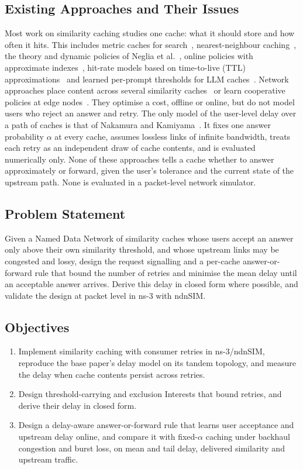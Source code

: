 \documentclass[11pt,a4paper]{article}
\begin{document}
\subsection{Existing Approaches and Their Issues}
Most work on similarity caching studies one cache: what it should store and how often it hits.
This includes metric caches for search~\cite{falchi2008metric}, nearest-neighbour
caching~\cite{pandey2009nn}, the theory and dynamic policies of Neglia et
al.~\cite{neglia2022similarity}, online policies with approximate indexes~\cite{sisalem2023acai},
hit-rate models based on time-to-live (TTL) approximations~\cite{benmazziane2024ttl} and learned
per-prompt thresholds for LLM caches~\cite{schroeder2025vcache}. Network approaches place content
across several similarity caches~\cite{garetto2021placement} or learn cooperative policies at edge
nodes~\cite{wang2025bandit}. They optimise a cost, offline or online, but do not model users who
reject an answer and retry. The only model of the user-level delay over a path of caches is that of
Nakamura and Kamiyama~\cite{nakamura2024analysis}. It fixes one answer probability $\alpha$ at every
cache, assumes lossless links of infinite bandwidth, treats each retry as an independent draw of
cache contents, and is evaluated numerically only. None of these approaches tells a cache whether to
answer approximately or forward, given the user's tolerance and the current state of the upstream
path. None is evaluated in a packet-level network simulator.

\subsection{Problem Statement}
Given a Named Data Network of similarity caches whose users accept an answer only above their own
similarity threshold, and whose upstream links may be congested and lossy, design the request
signalling and a per-cache answer-or-forward rule that bound the number of retries and minimise the
mean delay until an acceptable answer arrives. Derive this delay in closed form where possible, and
validate the design at packet level in ns-3 with ndnSIM.

\subsection{Objectives}
\begin{enumerate}[label=\textbf{O\arabic*.}]
  \item Implement similarity caching with consumer retries in ns-3/ndnSIM, reproduce the base
        paper's delay model on its tandem topology, and measure the delay when cache contents
        persist across retries.
  \item Design threshold-carrying and exclusion Interests that bound retries, and derive their
        delay in closed form.
  \item Design a delay-aware answer-or-forward rule that learns user acceptance and upstream delay
        online, and compare it with fixed-$\alpha$ caching under backhaul congestion and burst loss,
        on mean and tail delay, delivered similarity and upstream traffic.
\end{enumerate}
\end{document}
